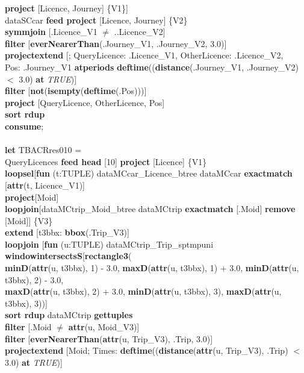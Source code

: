 \documentclass[a4paper]{article}
\newcommand{\op}[1]{\textbf{#1}}
\newcommand{\true}{\textsl{TRUE}}
\begin{document}
\begin{scriptsize}
\begin{tabbing}
\>\>\>\op{project} [Licence, Journey] \{V1\}]\\
\>dataSCcar \op{feed project} [Licence, Journey] \{V2\}\\
\>\op{symmjoin} [.Licence\_V1 $\neq$ ..Licence\_V2]\\
\>\op{filter} [\op{everNearerThan}(.Journey\_V1, .Journey\_V2, 3.0)]\\
\>\op{projectextend} [; QueryLicence: .Licence\_V1, OtherLicence: .Licence\_V2,\\
\>\>\>\>Pos: .Journey\_V1 \op{atperiods} \op{deftime}((\op{distance}(.Journey\_V1, .Journey\_V2) $<$ 3.0) \op{at} \true{})]\\
\>\op{filter} [\op{not}(\op{isempty}(\op{deftime}(.Pos)))]\\
\>\op{project} [QueryLicence, OtherLicence, Pos]\\
\>\op{sort rdup}\\
\op{consume};\\
\\
\op{let} TBACRres010 =\\
\>QueryLicences \op{feed head} [10] \op{project} [Licence] \{V1\}\\
\>\op{loopsel}[\op{fun} (t:TUPLE) dataMCcar\_Licence\_btree dataMCcar \op{exactmatch} [\op{attr}(t, Licence\_V1)]\\
\>\>\op{project}[Moid]\\
\>\>\op{loopjoin}[dataMCtrip\_Moid\_btree dataMCtrip \op{exactmatch} [.Moid] \op{remove} [Moid]] \{V3\}\\
\>\>\op{extend} [t3bbx: \op{bbox}(.Trip\_V3)]\\
\>\>\op{loopjoin} [\op{fun} (u:TUPLE) dataMCtrip\_Trip\_sptmpuni \op{windowintersectsS}[\op{rectangle3}(\\
\>\>\>\>\op{minD}(\op{attr}(u, t3bbx), 1) - 3.0, \op{maxD}(\op{attr}(u, t3bbx), 1) + 3.0, \op{minD}(\op{attr}(u, t3bbx), 2) - 3.0,\\
\>\>\>\>\op{maxD}(\op{attr}(u, t3bbx), 2) + 3.0, \op{minD}(\op{attr}(u, t3bbx), 3), \op{maxD}(\op{attr}(u, t3bbx), 3))]\\
\>\>\>\op{sort rdup} dataMCtrip \op{gettuples}\\
\>\>\>\op{filter} [.Moid $\neq$ \op{attr}(u, Moid\_V3)]\\
\>\>\>\op{filter} [\op{everNearerThan}(\op{attr}(u, Trip\_V3), .Trip, 3.0)]\\
\>\>\>\op{projectextend} [Moid; Times: \op{deftime}((\op{distance}(\op{attr}(u, Trip\_V3), .Trip) $<$ 3.0) \op{at} \true{})]\\

\end{tabbing}
\end{scriptsize}
\end{document}
